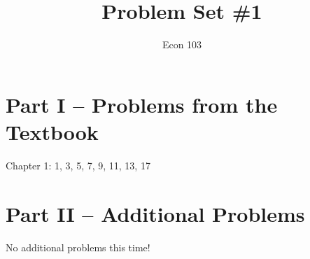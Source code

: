 \documentclass[addpoints,12pt]{exam}
\title{Problem Set \#1}
\author{Econ 103}
\date{}
\begin{document}
\maketitle

\section*{Part I -- Problems from the Textbook}
Chapter 1: 1, 3, 5, 7, 9, 11, 13, 17

\section*{Part II -- Additional Problems}
No additional problems this time!


\end{document}
